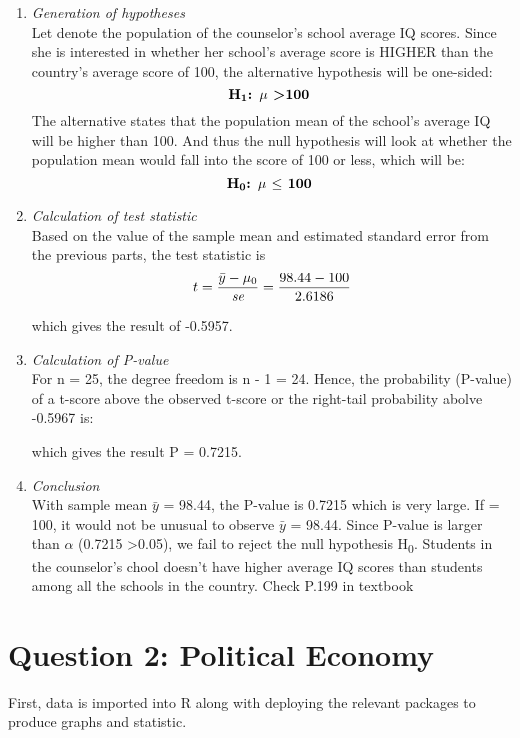 \documentclass[12pt,letterpaper]{article}
\begin{document}
\begin{enumerate}
\begin{enumerate}
		\item \textit{Generation of hypotheses}\\
		Let {\textmu} denote the population of the counselor's school average IQ scores. Since she is interested in whether her school's average score is HIGHER than the country's average score of 100, the alternative hypothesis will be one-sided:
 				$${\textbf{H\textsubscript{1}: $\mu$ \textgreater 100 }}$$
 		The alternative states that the population mean of the school's average IQ will be higher than 100. And thus the null hypothesis will look at whether the population mean would fall into the score of 100 or less, which will be:
 				$${\textbf{H\textsubscript{0}: $\mu$ $\le$ 100 }}$$
 				
		\item \textit{Calculation of test statistic}\\
		Based on the value of the sample mean and estimated standard error from the previous parts, the test statistic is
			$${t = \frac{\bar{y} - \mu\textsubscript{0}}{\textit{se}}} = \frac{98.44 - 100}{2.6186}$$
			
		which gives the result of -0.5957.
		
		\item \textit{Calculation of P-value}\\
		For n = 25, the degree freedom is n - 1 = 24. Hence, the probability (P-value) of a t-score above the observed t-score or the right-tail probability abolve -0.5967 is:
			 
		which gives the result P = 0.7215.
		
		\item \textit{Conclusion}\\
		With sample mean $\bar{y}$ = 98.44, the P-value is 0.7215 which is very large. If \textmu = 100, it would not be unusual to observe $\bar{y}$ = 98.44. Since P-value is larger than $\alpha$ (0.7215 \textgreater 0.05), we fail to reject the null hypothesis H\textsubscript{0}. Students in the counselor's chool doesn't have higher average IQ scores than students among all the schools in the country. Check P.199 in textbook
		
	\end{enumerate}
\end{enumerate} 

\section*{Question 2: Political Economy}
First, data is imported into R along with deploying the relevant packages to produce graphs and statistic.
	
\end{document}

